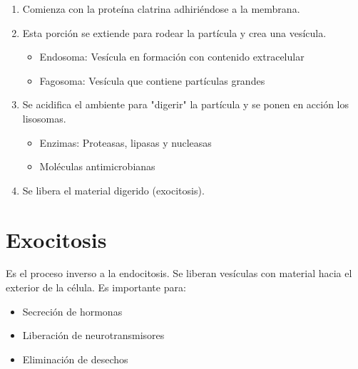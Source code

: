\begin{enumerate}
    \item Comienza con la proteína clatrina adhiriéndose a la membrana.
    \item Esta porción se extiende para rodear la partícula y crea una vesícula.
        \begin{itemize}
            \item Endosoma: Vesícula en formación con contenido extracelular
            \item Fagosoma: Vesícula que contiene partículas grandes
        \end{itemize}
    \item Se acidifica el ambiente para "digerir" la partícula y se ponen en acción los lisosomas.
        \begin{itemize}
            \item Enzimas: Proteasas, lipasas y nucleasas
            \item Moléculas antimicrobianas
        \end{itemize}
    \item Se libera el material digerido (exocitosis).
\end{enumerate}

\section{Exocitosis}

Es el proceso inverso a la endocitosis. Se liberan vesículas con material hacia el exterior de la célula. Es importante para:
\begin{itemize}
    \item Secreción de hormonas
    \item Liberación de neurotransmisores
    \item Eliminación de desechos
\end{itemize}